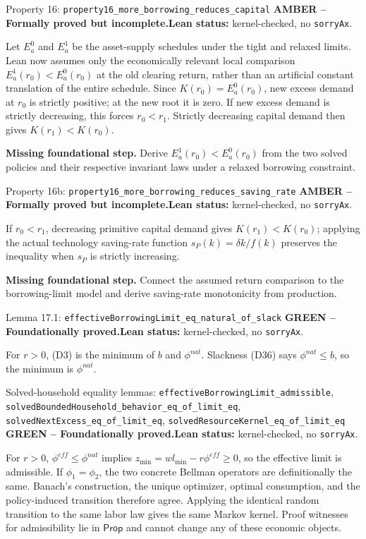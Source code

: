 \documentclass[11pt]{article}
\newcommand{\leanname}[1]{\nolinkurl{#1}}
\newcommand{\formalcheck}{\textbf{Lean status:} kernel-checked, no \texttt{sorryAx}.}
\newcommand{\missing}[1]{\par\smallskip\textbf{Missing foundational step.} #1}
\newcommand{\greenstatus}{\textcolor{proved}{\textbf{GREEN -- Foundationally proved.}}}
\newcommand{\amberstatus}{\textcolor{conditional}{\textbf{AMBER -- Formally proved but incomplete.}}}
\begin{document}
\begin{amberbox}{Property 16: \leanname{property16_more_borrowing_reduces_capital}}
\amberstatus\quad\formalcheck

Let $E_a^0$ and $E_a^1$ be the asset-supply schedules under the tight and
relaxed limits.  Lean now assumes only the economically relevant local
comparison $E_a^1(r_0)<E_a^0(r_0)$ at the old clearing return, rather than an
artificial constant translation of the entire schedule.  Since
$K(r_0)=E_a^0(r_0)$, new excess demand at $r_0$ is strictly positive; at the
new root it is zero.  If new excess demand is strictly decreasing, this forces
$r_0<r_1$.  Strictly decreasing capital demand then gives
$K(r_1)<K(r_0)$.

\missing{Derive $E_a^1(r_0)<E_a^0(r_0)$ from the two solved policies and their
respective invariant laws under a relaxed borrowing constraint.}
\end{amberbox}

\begin{amberbox}{Property 16b: \leanname{property16_more_borrowing_reduces_saving_rate}}
\amberstatus\quad\formalcheck

If \(r_0<r_1\), decreasing primitive capital demand gives
$K(r_1)<K(r_0)$; applying the actual technology saving-rate function
$s_P(k)=\delta k/f(k)$ preserves the inequality when $s_P$ is strictly
increasing.

\missing{Connect the assumed return comparison to the borrowing-limit model
and derive saving-rate monotonicity from production.}
\end{amberbox}

\begin{greenbox}{Lemma 17.1: \leanname{effectiveBorrowingLimit_eq_natural_of_slack}}
\greenstatus\quad\formalcheck

For \(r>0\), (D3) is the minimum of \(b\) and \(\phi^{nat}\).  Slackness
(D36) says \(\phi^{nat}\le b\), so the minimum is \(\phi^{nat}\).
\end{greenbox}

\begin{greenbox}{Solved-household equality lemmas:
\leanname{effectiveBorrowingLimit_admissible},
\leanname{solvedBoundedHousehold_behavior_eq_of_limit_eq},
\leanname{solvedNextExcess_eq_of_limit_eq},
\leanname{solvedResourceKernel_eq_of_limit_eq}}
\greenstatus\quad\formalcheck

For $r>0$, $\phi^{eff}\le\phi^{nat}$ implies
$z_{\min}=wl_{\min}-r\phi^{eff}\ge0$, so the effective limit is admissible.
If $\phi_1=\phi_2$, the two concrete Bellman operators are definitionally the
same.  Banach's construction, the unique optimizer, optimal consumption, and
the policy-induced transition therefore agree.  Applying the identical
random transition to the same labor law gives the same Markov kernel.  Proof
witnesses for admissibility lie in $\mathsf{Prop}$ and cannot change any of
these economic objects.
\end{greenbox}
\end{document}
